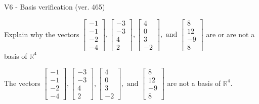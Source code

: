 \begin{exercise}
  \begin{exerciseTitle}V6 - Basis verification (ver. 465)\end{exerciseTitle}
  \begin{exerciseStatement}
    Explain why the vectors \(\left[\begin{array}{r}
-1 \\
-1 \\
-2 \\
-4
\end{array}\right] , \left[\begin{array}{r}
-3 \\
-3 \\
4 \\
2
\end{array}\right] , \left[\begin{array}{r}
4 \\
0 \\
3 \\
-2
\end{array}\right] , \text{ and } \left[\begin{array}{r}
8 \\
12 \\
-9 \\
8
\end{array}\right]\) are or are not a basis of \(\mathbb{R}^4\)	


  \end{exerciseStatement}
  \begin{exerciseAnswer}
   The vectors \(\left[\begin{array}{r}
-1 \\
-1 \\
-2 \\
-4
\end{array}\right] , \left[\begin{array}{r}
-3 \\
-3 \\
4 \\
2
\end{array}\right] , \left[\begin{array}{r}
4 \\
0 \\
3 \\
-2
\end{array}\right] , \text{ and } \left[\begin{array}{r}
8 \\
12 \\
-9 \\
8
\end{array}\right]\) 
  	 are not  a basis of \(\mathbb{R}^4\).
  


  \end{exerciseAnswer}
\end{exercise}